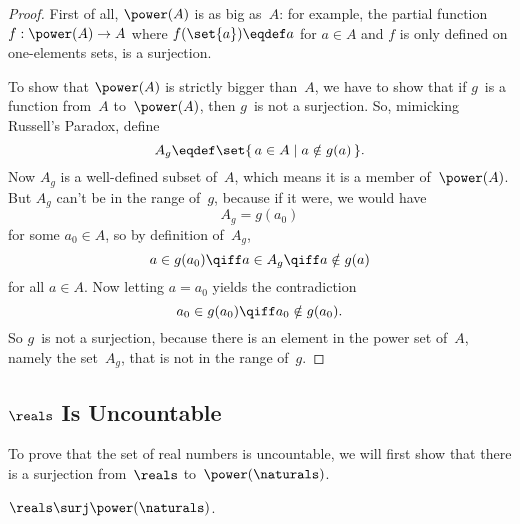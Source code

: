 \begin{proof}

First of all, $\power(A)$ is as big as~$A$: for example, the partial
function $f : \power(A) \to A$ where $f(\set{a}) \eqdef a$ for $a \in
A$ and $f$ is only defined on one-elements sets, is a surjection.

To show that $\power(A)$ is strictly bigger than~$A$, we have to show
that if $g$~is a function from~$A$ to~$\power(A)$, then $g$~is not a
surjection.  So, mimicking Russell's Paradox, define
\begin{equation*}
    A_g \eqdef \set{\, a \in A \mid a \notin g(a) \,}.
\end{equation*}
Now $A_g$ is a well-defined subset of~$A$, which means it is a member
of~$\power(A)$.  But $A_g$ can't be in the range of~$g$, because if it
were, we would have
\begin{equation*}
    A_g = g(a_0)
\end{equation*}
for some $a_0 \in A$, so by definition of~$A_g$,
\begin{equation*}
    a \in g(a_0) \qiff a \in A_g \qiff a \notin g(a)
\end{equation*}
for all $a \in A$.  Now letting $a = a_0$ yields the contradiction
\begin{equation*}
    a_0 \in g(a_0) \qiff a_0 \notin g(a_0).
\end{equation*}
So $g$~is not a surjection, because there is an element in the power
set of~$A$, namely the set~$A_g$, that is not in the range of~$g$.
\end{proof}

\subsection{$\reals$ Is Uncountable}

To prove that the set of real numbers is uncountable, we will first
show that there is a surjection from~$\reals$ to~$\power(\naturals)$.

\begin{lemma}\label{lem:13D7}
$\reals \surj \power(\naturals)$.
\end{lemma}

